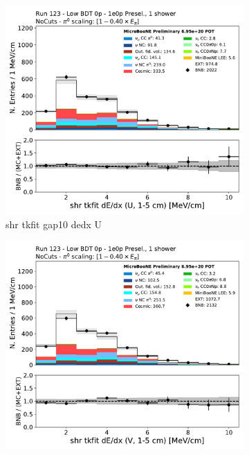 \begin{figure}[H]
    \centering
    \begin{subfigure}{0.3\textwidth}
    \includegraphics[width=1.0\textwidth]{1e0p/Low_BDT_Sideband/shr_tkfit_gap10_dedx_U.pdf}
    \caption{shr tkfit gap10 dedx U}
    \end{subfigure}
    \begin{subfigure}{0.3\textwidth}
    \includegraphics[width=1.0\textwidth]{1e0p/Low_BDT_Sideband/shr_tkfit_gap10_dedx_V.pdf}

\end{subfigure}
\end{figure}
